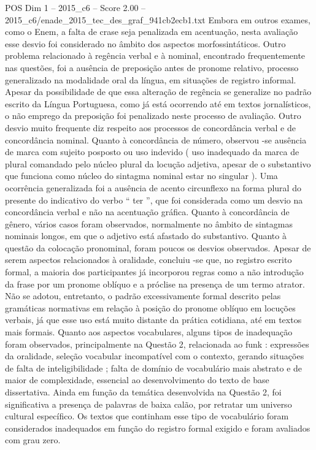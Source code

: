 \begin{textsample}{POS Dim 1 – 2015\_c6 – Score 2.00 – 2015\_c6/enade\_2015\_tec\_des\_graf\_941cb2ecb1.txt}
Embora em outros exames, como o Enem, a falta de crase seja penalizada em acentuação, nesta avaliação esse desvio foi considerado no âmbito dos aspectos morfossintáticos.
Outro problema relacionado à regência verbal e à nominal, encontrado frequentemente nas questões, foi a ausência de preposição antes de pronome relativo, processo generalizado na modalidade oral da língua, em situações de registro informal.
Apesar da possibilidade de que essa alteração de regência se generalize no padrão escrito da Língua Portuguesa, como já está ocorrendo até em textos jornalísticos, o não emprego da preposição foi penalizado neste processo de avaliação.
Outro desvio muito frequente diz respeito aos processos de concordância verbal e de concordância nominal.
Quanto à concordância de número, observou -se ausência de marca com sujeito posposto ou uso indevido ( uso inadequado da marca de plural comandado pelo núcleo plural da locução adjetiva, apesar de o substantivo que funciona como núcleo do sintagma nominal estar no singular ).
Uma ocorrência generalizada foi a ausência de acento circunflexo na forma plural do presente do indicativo do verbo “ ter ”, que foi considerada como um desvio na concordância verbal e não na acentuação gráfica.
Quanto à concordância de gênero, vários casos foram observados, normalmente no âmbito de sintagmas nominais longos, em que o adjetivo está afastado do substantivo.
Quanto à questão da colocação pronominal, foram poucos os desvios observados.
Apesar de serem aspectos relacionados à oralidade, concluiu -se que, no registro escrito formal, a maioria dos participantes já incorporou regras como a não introdução da frase por um pronome oblíquo e a próclise na presença de um termo atrator.
Não se adotou, entretanto, o padrão excessivamente formal descrito pelas gramáticas normativas em relação à posição do pronome oblíquo em locuções verbais, já que esse uso está muito distante da prática cotidiana, até em textos mais formais.
Quanto aos aspectos vocabulares, alguns tipos de inadequação foram observados, principalmente na Questão 2, relacionada ao funk : expressões da oralidade, seleção vocabular incompatível com o contexto, gerando situações de falta de inteligibilidade ; falta de domínio de vocabulário mais abstrato e de maior de complexidade, essencial ao desenvolvimento do texto de base dissertativa.
Ainda em função da temática desenvolvida na Questão 2, foi significativa a presença de palavras de baixa calão, por retratar um universo cultural específico.
Os textos que continham esse tipo de vocabulário foram considerados inadequados em função do registro formal exigido e foram avaliados com grau zero.

\end{textsample}
